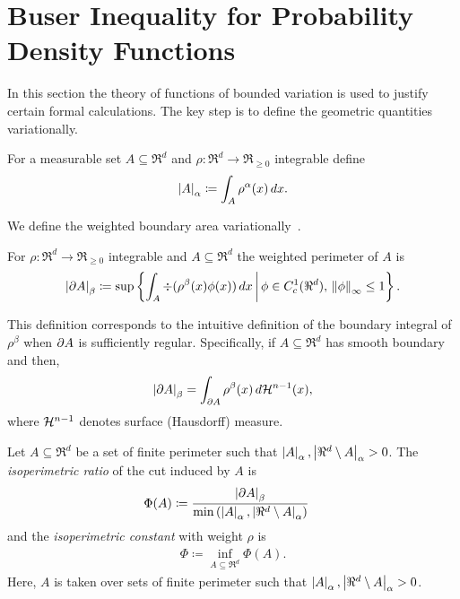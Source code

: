 
\section{Buser Inequality for Probability Density Functions} \label{sec:buser}

In this section the theory of functions of bounded variation is used to
justify certain formal calculations. The key step is to define the geometric
quantities variationally.

\begin{definition}
  For a measurable set $A\subseteq \Re^d$ and $\rho:\Re^d \rightarrow
  \Re_{\geq 0}$ integrable define
  \begin{align*}
    \left| A \right|_\alpha \coloneqq \int_A \rho^\alpha(x)\,dx.
  \end{align*}
\end{definition}

We define the weighted boundary area
variationally~\cite{betta2008weighted,parini2011introduction}.

\begin{definition}
\label{def:betaBdy}
For $\rho:\Re^d \rightarrow \Re_{\geq 0}$ integrable and $A\subseteq\Re^d$
the weighted perimeter of $A$ is
\begin{align*}
\left| \partial A \right|_\beta \coloneqq \sup\left\{
\int_A \div(\rho^\beta (x) \phi(x))\,dx
\,\middle|\, \phi\in C_c^1(\Re^d),\, \left\lVert \phi \right\rVert_{\infty}\leq 1\right\}.
\end{align*}
\end{definition}

\begin{remark}
  This definition corresponds to the intuitive definition of the
  boundary integral of $\rho^\beta$ when $\partial A$ is sufficiently
  regular.  Specifically, if $A\subseteq\Re^d$ has smooth boundary
  and then,
  $$
  \left| \partial A \right|_\beta = \int_{\partial A} \rho^\beta(x)\,d \mathcal H^{n-1}(x),
  $$
  where $\mathcal H^{n-1}$ denotes surface (Hausdorff) measure.
\end{remark}

\begin{definition}
  Let $A\subseteq\Re^d$ be a set of finite perimeter such that
  $\left| A \right|_\alpha,\left| \Re^d\setminus A \right|_\alpha >0$. The
  \textit{isoperimetric ratio} of the cut induced by $A$ is
\begin{align*}
\Phi(A) &\coloneqq \frac{\left| \partial A \right|_\beta}
{\min\left(\left| A \right|_\alpha,\left| \Re^d\setminus A \right|_\alpha\right)}
\end{align*}
and the \textit{isoperimetric constant} with weight $\rho$ is
\begin{align*}
  \Phi \coloneqq \inf_{A\subseteq \Re^d} \Phi(A).
\end{align*}
Here, $A$ is taken over sets of finite perimeter such that
$\left| A \right|_\alpha,\left| \Re^d \setminus A \right|_\alpha>0$.
\end{definition}

